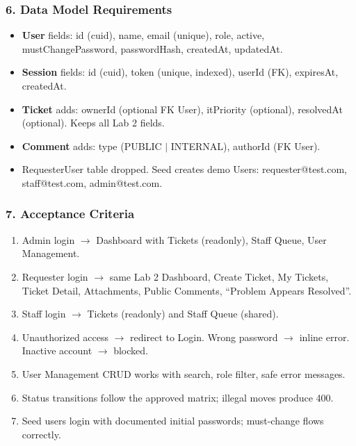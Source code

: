 \documentclass[11pt,a4paper]{article}
\begin{document}
\subsubsection*{6. Data Model Requirements}
\begin{itemize}
\item \textbf{User} fields: id (cuid), name, email (unique), role, active, mustChangePassword, passwordHash, createdAt, updatedAt.
\item \textbf{Session} fields: id (cuid), token (unique, indexed), userId (FK), expiresAt, createdAt.
\item \textbf{Ticket} adds: ownerId (optional FK User), itPriority (optional), resolvedAt (optional). Keeps all Lab 2 fields.
\item \textbf{Comment} adds: type (PUBLIC $\mid$ INTERNAL), authorId (FK User).
\item RequesterUser table dropped. Seed creates demo Users: requester@test.com, staff@test.com, admin@test.com.
\end{itemize}

\subsubsection*{7. Acceptance Criteria}
\begin{enumerate}[label=\arabic*.]
\item Admin login $\to$ Dashboard with Tickets (readonly), Staff Queue, User Management.
\item Requester login $\to$ same Lab 2 Dashboard, Create Ticket, My Tickets, Ticket Detail, Attachments, Public Comments, ``Problem Appears Resolved''.
\item Staff login $\to$ Tickets (readonly) and Staff Queue (shared).
\item Unauthorized access $\to$ redirect to Login. Wrong password $\to$ inline error. Inactive account $\to$ blocked.
\item User Management CRUD works with search, role filter, safe error messages.
\item Status transitions follow the approved matrix; illegal moves produce 400.
\item Seed users login with documented initial passwords; must-change flows correctly.
\end{enumerate}
\end{document}
